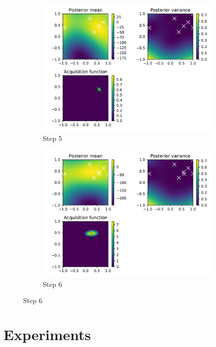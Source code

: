 \documentclass[10pt,a4paper,twoside]{book}
\begin{document}
\begin{figure}
	\begin{subfigure}[b]{0.45\textwidth}
		\caption{Step 5}
		\includegraphics[width=\textwidth]{figures/chapter3/rosen/4.pdf}
	\end{subfigure}
	\begin{subfigure}[b]{0.45\textwidth}
		\caption{Step 6}
		\includegraphics[width=\textwidth]{figures/chapter3/rosen/5.pdf}
	\end{subfigure}
\end{figure}

\chapter{Experiments}
\end{document}
